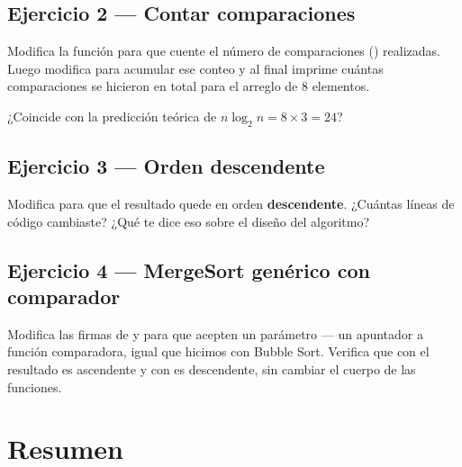 \documentclass[12pt, oneside]{article}
\begin{document}
\subsection*{Ejercicio 2 — Contar comparaciones}

Modifica la función  para que cuente el número de comparaciones
() realizadas. Luego modifica  para
acumular ese conteo y al final imprime cuántas comparaciones se hicieron en
total para el arreglo de 8 elementos.

\noindent¿Coincide con la predicción teórica de $n \log_2 n = 8 \times 3 = 24$?

\subsection*{Ejercicio 3 — Orden descendente}

Modifica  para que el resultado quede en orden \textbf{descendente}.
¿Cuántas líneas de código cambiaste? ¿Qué te dice eso sobre el diseño del algoritmo?

\subsection*{Ejercicio 4 — MergeSort genérico con comparador}

Modifica las firmas de  y  para que acepten un
parámetro  — un apuntador a función comparadora,
igual que hicimos con Bubble Sort. Verifica que con  el resultado es ascendente y con  es
descendente, sin cambiar el cuerpo de las funciones.

\section{Resumen}
\end{document}
